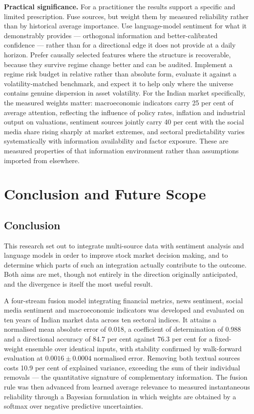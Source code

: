 \textbf{Practical significance.} For a practitioner the results support a specific and
limited prescription. Fuse sources, but weight them by measured reliability rather than by
historical average importance. Use language-model sentiment for what it demonstrably
provides --- orthogonal information and better-calibrated confidence --- rather than for a
directional edge it does not provide at a daily horizon. Prefer causally selected features
where the structure is recoverable, because they survive regime change better and can be
audited. Implement a regime risk budget in relative rather than absolute form, evaluate it
against a volatility-matched benchmark, and expect it to help only where the universe
contains genuine dispersion in asset volatility. For the Indian market specifically, the
measured weights matter: macroeconomic indicators carry 25 per cent of average attention,
reflecting the influence of policy rates, inflation and industrial output on valuations,
sentiment sources jointly carry 40 per cent with the social media share rising sharply at
market extremes, and sectoral predictability varies systematically with information
availability and factor exposure. These are measured properties of that information
environment rather than assumptions imported from elsewhere.

\chapter{Conclusion and Future Scope}

\section{Conclusion}

This research set out to integrate multi-source data with sentiment analysis and language
models in order to improve stock market decision making, and to determine which parts of
such an integration actually contribute to the outcome. Both aims are met, though not
entirely in the direction originally anticipated, and the divergence is itself the most
useful result.

A four-stream fusion model integrating financial metrics, news sentiment, social media
sentiment and macroeconomic indicators was developed and evaluated on ten years of Indian
market data across ten sectoral indices. It attains a normalised mean absolute error of
0.018, a coefficient of determination of 0.988 and a directional accuracy of 84.7 per cent
against 76.3 per cent for a fixed-weight ensemble over identical inputs, with stability
confirmed by walk-forward evaluation at $0.0016 \pm 0.0004$ normalised error. Removing
both textual sources costs 10.9 per cent of explained variance, exceeding the sum of their
individual removals --- the quantitative signature of complementary information. The
fusion rule was then advanced from learned average relevance to measured instantaneous
reliability through a Bayesian formulation in which weights are obtained by a softmax over
negative predictive uncertainties.

